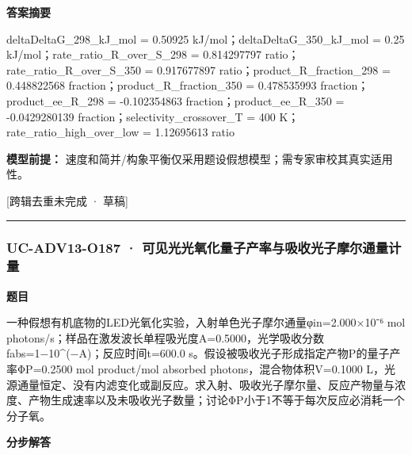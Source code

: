 \documentclass[UTF8,11pt,a4paper]{ctexart}
\begin{document}
\noindent\textbf{答案摘要}\par
deltaDeltaG\_298\_kJ\_mol = 0.50925 kJ/mol；deltaDeltaG\_350\_kJ\_mol = 0.25 kJ/mol；rate\_ratio\_R\_over\_S\_298 = 0.814297797 ratio；rate\_ratio\_R\_over\_S\_350 = 0.917677897 ratio；product\_R\_fraction\_298 = 0.448822568 fraction；product\_R\_fraction\_350 = 0.478535993 fraction；product\_ee\_R\_298 = -0.102354863 fraction；product\_ee\_R\_350 = -0.0429280139 fraction；selectivity\_crossover\_T = 400 K；rate\_ratio\_high\_over\_low = 1.12695613 ratio\par
\noindent\textbf{模型前提：}
速度和简并/构象平衡仅采用题设假想模型；需专家审校其真实适用性。\par
\noindent\textcolor{red!65!black}{[跨辑去重未完成 · 草稿]} \par
\medskip\hrule\medskip
{}
\subsubsection*{UC-ADV13-O187 · 可见光光氧化量子产率与吸收光子摩尔通量计量}
\noindent\textbf{题目}\par
一种假想有机底物的LED光氧化实验，入射单色光子摩尔通量φin=2.000×10⁻⁶ mol photons/s；样品在激发波长单程吸光度A=0.5000，光学吸收分数fabs=1−10\textasciicircum{}(−A)；反应时间t=600.0 s。假设被吸收光子形成指定产物P的量子产率ΦP=0.2500 mol product/mol absorbed photons，混合物体积V=0.1000 L，光源通量恒定、没有内滤变化或副反应。求入射、吸收光子摩尔量、反应产物量与浓度、产物生成速率以及未吸收光子数量；讨论ΦP小于1不等于每次反应必消耗一个分子氧。\par
\medskip\noindent\textbf{分步解答}
\end{document}
